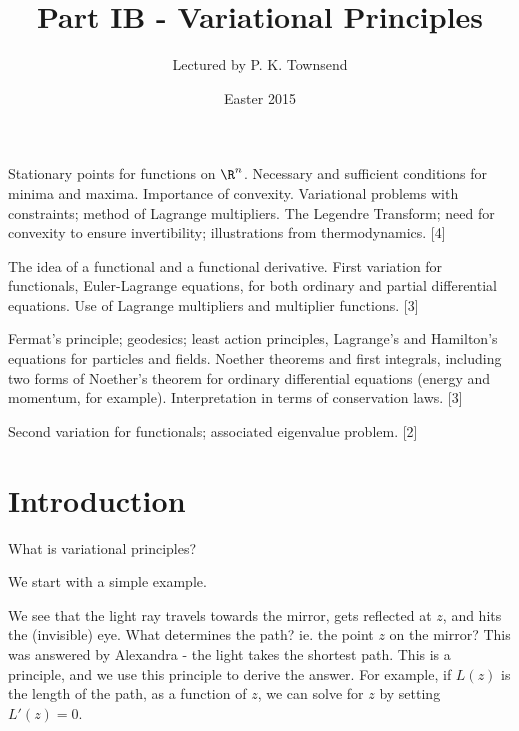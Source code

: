 \documentclass[a4paper]{article}
\title{Part IB - Variational Principles}
\author{Lectured by P. K. Townsend}
\date{Easter 2015}
\begin{document}
\maketitle
{\small
\noindent Stationary points for functions on $\R^n$. Necessary and sufficient conditions for minima and maxima. Importance of convexity. Variational problems with constraints; method of Lagrange multipliers. The Legendre Transform; need for convexity to ensure invertibility; illustrations from thermodynamics.\hspace*{\fill} [4]

\vspace{5pt}
\noindent The idea of a functional and a functional derivative. First variation for functionals, Euler-Lagrange equations, for both ordinary and partial differential equations. Use of Lagrange multipliers and multiplier functions.\hspace*{\fill} [3]

\vspace{5pt}
\noindent Fermat's principle; geodesics; least action principles, Lagrange's and Hamilton's equations for particles and fields. Noether theorems and first integrals, including two forms of Noether's theorem for ordinary differential equations (energy and momentum, for example). Interpretation in terms of conservation laws.\hspace*{\fill} [3]

\vspace{5pt}
\noindent Second variation for functionals; associated eigenvalue problem.\hspace*{\fill} [2]}

\tableofcontents
\setcounter{section}{-1}
\section{Introduction}
What is variational principles?

We start with a simple example.
\begin{center}
\end{center}
We see that the light ray travels towards the mirror, gets reflected at $z$, and hits the (invisible) eye. What determines the path? ie. the point $z$ on the mirror? This was answered by Alexandra - the light takes the shortest path. This is a principle, and we use this principle to derive the answer. For example, if $L(z)$ is the length of the path, as a function of $z$, we can solve for $z$ by setting $L'(z) = 0$.
\end{document}
